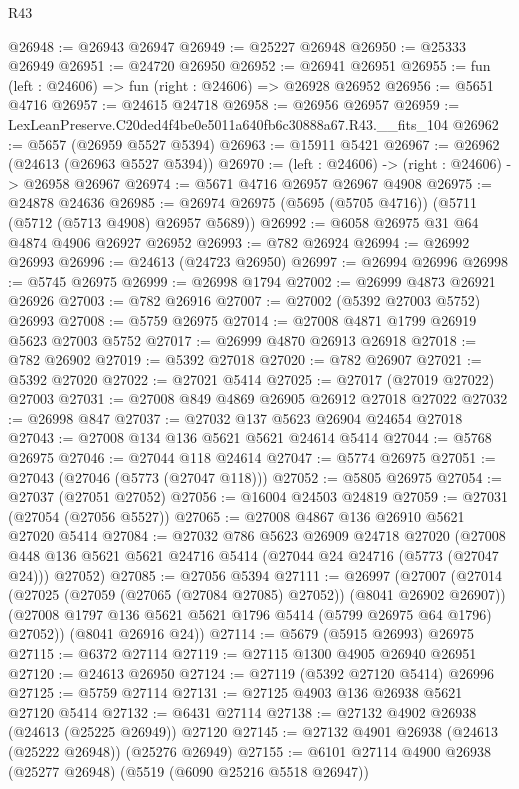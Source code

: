 \begin{lexlean}{R43}
\begin{coremodule}
@26948 := @26943 @26947
@26949 := @25227 @26948
@26950 := @25333 @26949
@26951 := @24720 @26950
@26952 := @26941 @26951
@26955 := fun (left : @24606) => fun (right : @24606) => @26928 @26952
@26956 := @5651 @4716
@26957 := @24615 @24718
@26958 := @26956 @26957
@26959 := LexLeanPreserve.C20ded4f4be0e5011a640fb6c30888a67.R43.__fits_104
@26962 := @5657 (@26959 @5527 @5394)
@26963 := @15911 @5421
@26967 := @26962 (@24613 (@26963 @5527 @5394))
@26970 := (left : @24606) -> (right : @24606) -> @26958 @26967
@26974 := @5671 @4716 @26957 @26967 @4908
@26975 := @24878 @24636
@26985 := @26974 @26975 (@5695 (@5705 @4716)) (@5711 (@5712 (@5713 @4908) @26957 @5689))
@26992 := @6058 @26975 @31 @64 @4874 @4906 @26927 @26952
@26993 := @782 @26924
@26994 := @26992 @26993
@26996 := @24613 (@24723 @26950)
@26997 := @26994 @26996
@26998 := @5745 @26975
@26999 := @26998 @1794
@27002 := @26999 @4873 @26921 @26926
@27003 := @782 @26916
@27007 := @27002 (@5392 @27003 @5752) @26993
@27008 := @5759 @26975
@27014 := @27008 @4871 @1799 @26919 @5623 @27003 @5752
@27017 := @26999 @4870 @26913 @26918
@27018 := @782 @26902
@27019 := @5392 @27018
@27020 := @782 @26907
@27021 := @5392 @27020
@27022 := @27021 @5414
@27025 := @27017 (@27019 @27022) @27003
@27031 := @27008 @849 @4869 @26905 @26912 @27018 @27022
@27032 := @26998 @847
@27037 := @27032 @137 @5623 @26904 @24654 @27018
@27043 := @27008 @134 @136 @5621 @5621 @24614 @5414
@27044 := @5768 @26975
@27046 := @27044 @118 @24614
@27047 := @5774 @26975
@27051 := @27043 (@27046 (@5773 (@27047 @118)))
@27052 := @5805 @26975
@27054 := @27037 (@27051 @27052)
@27056 := @16004 @24503 @24819
@27059 := @27031 (@27054 (@27056 @5527))
@27065 := @27008 @4867 @136 @26910 @5621 @27020 @5414
@27084 := @27032
    @786
    @5623
    @26909
    @24718
    @27020
    (@27008 @448 @136 @5621 @5621 @24716 @5414 (@27044 @24 @24716 (@5773 (@27047 @24))) @27052)
@27085 := @27056 @5394
@27111 := @26997
    (@27007
      (@27014
        (@27025 (@27059 (@27065 (@27084 @27085) @27052)) (@8041 @26902 @26907))
        (@27008 @1797 @136 @5621 @5621 @1796 @5414 (@5799 @26975 @64 @1796) @27052))
      (@8041 @26916 @24))
@27114 := @5679 (@5915 @26993) @26975
@27115 := @6372 @27114
@27119 := @27115 @1300 @4905 @26940 @26951
@27120 := @24613 @26950
@27124 := @27119 (@5392 @27120 @5414) @26996
@27125 := @5759 @27114
@27131 := @27125 @4903 @136 @26938 @5621 @27120 @5414
@27132 := @6431 @27114
@27138 := @27132 @4902 @26938 (@24613 (@25225 @26949)) @27120
@27145 := @27132 @4901 @26938 (@24613 (@25222 @26948)) (@25276 @26949)
@27155 := @6101 @27114 @4900 @26938 (@25277 @26948) (@5519 (@6090 @25216 @5518 @26947))

\end{coremodule}
\end{lexlean}
